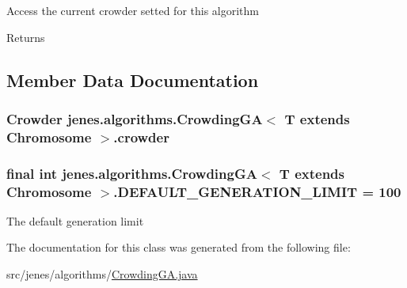 Access the current crowder setted for this algorithm \begin{DoxyReturn}{Returns}

\end{DoxyReturn}


\subsection{Member Data Documentation}
\hypertarget{classjenes_1_1algorithms_1_1_crowding_g_a_3_01_t_01extends_01_chromosome_01_4_aa747112afbb20cb4faec643ccc73e396}{
\subsubsection[{crowder}]{\setlength{\rightskip}{0pt plus 5cm}Crowder jenes.\-algorithms.\-Crowding\-G\-A$<$ T extends Chromosome $>$.crowder\hspace{0.3cm}{\ttfamily [protected]}}}\label{classjenes_1_1algorithms_1_1_crowding_g_a_3_01_t_01extends_01_chromosome_01_4_aa747112afbb20cb4faec643ccc73e396}
\hypertarget{classjenes_1_1algorithms_1_1_crowding_g_a_3_01_t_01extends_01_chromosome_01_4_afb96c2e73129293b45044998e3614c06}{
\subsubsection[{D\-E\-F\-A\-U\-L\-T\-\_\-\-G\-E\-N\-E\-R\-A\-T\-I\-O\-N\-\_\-\-L\-I\-M\-I\-T}]{\setlength{\rightskip}{0pt plus 5cm}final int jenes.\-algorithms.\-Crowding\-G\-A$<$ T extends Chromosome $>$.D\-E\-F\-A\-U\-L\-T\-\_\-\-G\-E\-N\-E\-R\-A\-T\-I\-O\-N\-\_\-\-L\-I\-M\-I\-T = 100\hspace{0.3cm}{\ttfamily [static]}}}\label{classjenes_1_1algorithms_1_1_crowding_g_a_3_01_t_01extends_01_chromosome_01_4_afb96c2e73129293b45044998e3614c06}
The default generation limit 

The documentation for this class was generated from the following file\-:\begin{DoxyCompactItemize}
\item 
src/jenes/algorithms/\hyperlink{_crowding_g_a_8java}{Crowding\-G\-A.\-java}\end{DoxyCompactItemize}
